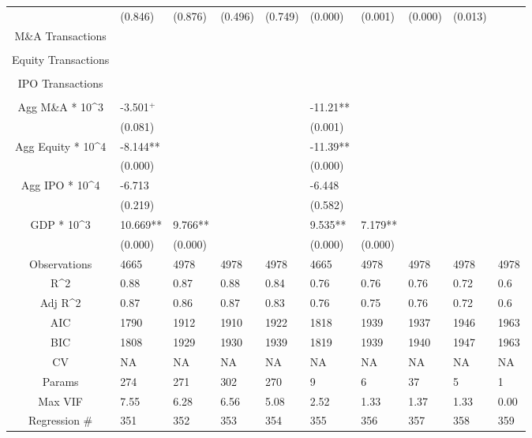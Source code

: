 \documentclass{article}
\begin{document}
\begin{table}[H]
\begin{tabular}{|clllllllll|}
   & (0.846) & (0.876) & (0.496) & (0.749) & (0.000) & (0.001) & (0.000) & (0.013) &  \\ 
  M\&A Transactions &  &  &  &  &  &  &  &  &  \\ 
   &  &  &  &  &  &  &  &  &  \\ 
  Equity Transactions &  &  &  &  &  &  &  &  &  \\ 
   &  &  &  &  &  &  &  &  &  \\ 
  IPO Transactions &  &  &  &  &  &  &  &  &  \\ 
   &  &  &  &  &  &  &  &  &  \\ 
  Agg M\&A * 10^3 & -3.501$^{+}$ &  &  &  & -11.21** &  &  &  &  \\ 
   & (0.081) &  &  &  & (0.001) &  &  &  &  \\ 
  Agg Equity * 10^4 & -8.144** &  &  &  & -11.39** &  &  &  &  \\ 
   & (0.000) &  &  &  & (0.000) &  &  &  &  \\ 
  Agg IPO * 10^4 & -6.713 &  &  &  & -6.448 &  &  &  &  \\ 
   & (0.219) &  &  &  & (0.582) &  &  &  &  \\ 
  GDP * 10^3 & 10.669** & 9.766** &  &  & 9.535** & 7.179** &  &  &  \\ 
   & (0.000) & (0.000) &  &  & (0.000) & (0.000) &  &  &  \\ 
  \hline 
 Observations & 4665 & 4978 & 4978 & 4978 & 4665 & 4978 & 4978 & 4978 & 4978 \\ 
  R^2 & 0.88 & 0.87 & 0.88 & 0.84 & 0.76 & 0.76 & 0.76 & 0.72 & 0.6 \\ 
  Adj R^2 & 0.87 & 0.86 & 0.87 & 0.83 & 0.76 & 0.75 & 0.76 & 0.72 & 0.6 \\ 
  AIC & 1790 & 1912 & 1910 & 1922 & 1818 & 1939 & 1937 & 1946 & 1963 \\ 
  BIC & 1808 & 1929 & 1930 & 1939 & 1819 & 1939 & 1940 & 1947 & 1963 \\ 
  CV & NA & NA & NA & NA & NA & NA & NA & NA & NA \\ 
  Params & 274 & 271 & 302 & 270 & 9 & 6 & 37 & 5 & 1 \\ 
  Max VIF & 7.55 & 6.28 & 6.56 & 5.08 & 2.52 & 1.33 & 1.37 & 1.33 & 0.00 \\ 
  Regression \# & 351 & 352 & 353 & 354 & 355 & 356 & 357 & 358 & 359 \\ 
   \hline
\end{tabular}
 
\end{table}
\end{document}
